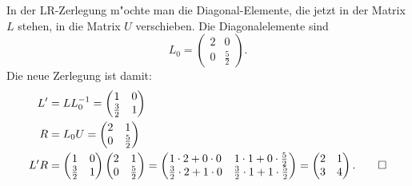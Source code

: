 \begin{loesung}
In der LR-Zerlegung m"ochte man die Diagonal-Elemente, die jetzt in
der Matrix $L$ stehen, in die Matrix $U$ verschieben. Die Diagonalelemente
sind
\[
L_0=\begin{pmatrix}2&0\\0&\frac52\end{pmatrix}.
\]
Die neue Zerlegung ist damit:
\begin{align*}
L'&=LL_0^{-1}=
\begin{pmatrix}
1&0\\
\frac32&1
\end{pmatrix}
\\
R&=L_0U=
\begin{pmatrix}
2&1\\
0&\frac52
\end{pmatrix}
\\
L'R&=
\begin{pmatrix}
1&0\\
\frac32&1
\end{pmatrix}
\begin{pmatrix}
2&1\\
0&\frac52
\end{pmatrix}
=\begin{pmatrix}
1\cdot 2+0\cdot 0 & 1 \cdot 1+0\cdot \frac52\\
\frac32\cdot 2+1\cdot 0&\frac32\cdot 1+1\cdot\frac52
\end{pmatrix}
=
\begin{pmatrix}
2&1\\3&4
\end{pmatrix}.
\qedhere
\end{align*}
\end{loesung}


